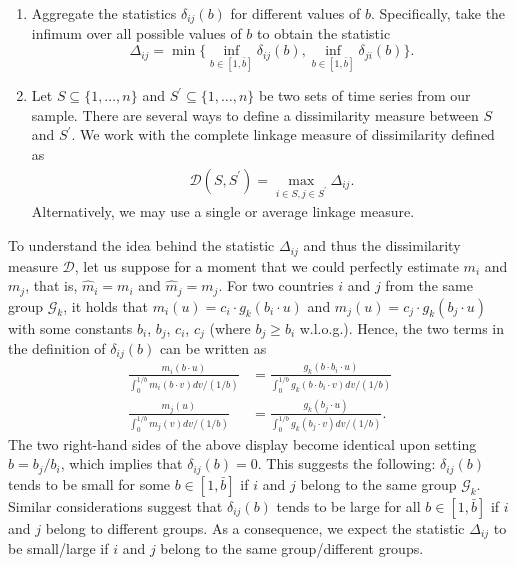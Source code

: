 \documentclass[a4paper,12pt]{article}
\numberwithin{equation}{section}
\begin{document}
\begin{enumerate}[label=\textit{Step \arabic*.},leftmargin=1.45cm]


\item Aggregate the statistics $\delta_{ij}(b)$ for different values of $b$. Specifically, take the infimum over all possible values of $b$ to obtain the statistic
\[ \Delta_{ij} = \min \Big\{ \inf_{b\in [1, \bar{b}]} \delta_{ij}(b), \inf_{b\in [1, \bar{b}]} \delta_{ji}(b) \Big\}. \]


\item Let $S \subseteq \{1, \ldots, n\}$ and $S^\prime \subseteq \{1, \ldots, n\}$ be two sets of time series from our sample. There are several ways to define a dissimilarity measure between $S$ and $S^\prime$. We work with the complete linkage measure of dissimilarity defined as 
\begin{align*}
\mathcal{D} (S, S^\prime) = \max_{i \in S, j\in S^\prime} \Delta_{ij}.
\end{align*}
Alternatively, we may use a single or average linkage measure. 


\end{enumerate}


To understand the idea behind the statistic $\Delta_{ij}$ and thus the dissimilarity measure $\mathcal{D}$, let us suppose for a moment that we could perfectly estimate $m_i$ and $m_j$, that is, $\hat{m}_i = m_i$ and $\hat{m}_j = m_j$. For two countries $i$ and $j$ from the same group $\mathcal{G}_k$, it holds that $m_i(u) = c_i \cdot g_k(b_i \cdot u)$ and $m_j(u) = c_j \cdot g_k(b_j \cdot u)$ with some constants $b_i$, $b_j$, $c_i$, $c_j$ (where $b_j \ge b_i$ w.l.o.g.). Hence, the two terms in the definition of $\delta_{ij}(b)$ can be written as  
\begin{align*}
\frac{m_i (b\cdot u)}{\int_0^{1/b} m_i(b\cdot v) dv /(1/b)} & = \frac{g_k (b \cdot b_i \cdot u)}{\int_0^{1/b} g_k(b \cdot b_i \cdot v) dv /(1/b)} \\
\frac{m_j (u)}{\int_0^{1/b} m_j(v) dv /(1/b)} & = \frac{g_k (b_j \cdot u)}{\int_0^{1/b} g_k(b_j \cdot v) dv /(1/b)}.
\end{align*}
The two right-hand sides of the above display become identical upon setting $b = b_j/b_i$, which implies that $\delta_{ij}(b) = 0$. This suggests the following: $\delta_{ij}(b)$ tends to be small for some $b \in [1,\bar{b}]$ if $i$ and $j$ belong to the same group $\mathcal{G}_k$. Similar considerations suggest that $\delta_{ij}(b)$ tends to be large for all $b \in [1,\bar{b}]$ if $i$ and $j$ belong to different groups. As a consequence, we expect the statistic $\Delta_{ij}$ to be small/large if $i$ and $j$ belong to the same group/different groups. 
\end{document}
